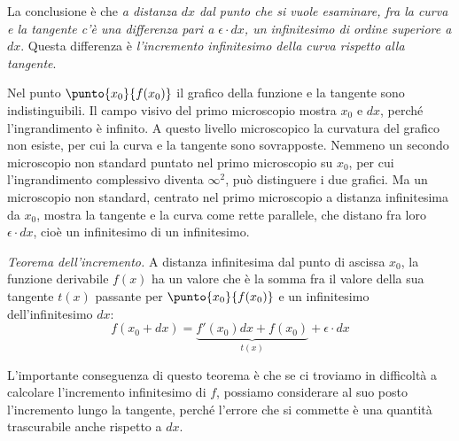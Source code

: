 La conclusione è che \emph{a distanza \(dx\) dal punto che si vuole 
esaminare, fra la curva e la tangente c'è una differenza pari a 
\(\epsilon\cdot dx\), un infinitesimo di ordine superiore a \(dx\)}. 
Questa differenza è \emph{l'incremento infinitesimo della curva rispetto 
alla tangente}.

\begin{minipage}[]{.47\textwidth}
\begin{inaccessibleblock}
    \begin{center} \differenzialens \end{center}
\end{inaccessibleblock}
\end{minipage} 
  \hfill
\begin{minipage}[]{.47\textwidth} \vspace{2.5em}
Nel punto \(\punto{x_0}{f(x_0)}\) il grafico della funzione e la tangente
sono indistinguibili. 
Il campo visivo del primo microscopio mostra \({x_0}\) e \(dx\), 
perché l'ingrandimento è infinito. A questo livello 
microscopico la curvatura del grafico non esiste,  per cui la curva e 
la tangente sono sovrapposte. 
Nemmeno un secondo microscopio non standard puntato 
nel primo microscopio su \(x_0\), per cui 
l'ingrandimento complessivo diventa \(\infty^2\), può distinguere i due 
grafici. 
Ma un microscopio non standard, centrato nel primo microscopio a 
distanza infinitesima da \(x_0\), mostra la tangente e 
la curva come rette parallele, che distano fra loro 
\(\epsilon \cdot dx\), cioè un infinitesimo di un infinitesimo.
\end{minipage}
\label{}

\begin{teorema}
\label{teo:inc}
\emph{Teorema dell'incremento.} A distanza infinitesima dal punto di 
ascissa \(x_0\), la funzione derivabile \(f(x)\) ha un valore che è la 
somma fra il valore della sua tangente \(t(x)\) passante per 
\(\punto{x_0}{f(x_0)}\) e un infinitesimo dell'infinitesimo \(dx\):
\[f(x_0+dx)=\underbrace{f'(x_0)dx+f(x_0)}_{t(x)}+\epsilon\cdot dx\]
\end{teorema}
L'importante conseguenza di questo teorema è che se ci troviamo in 
difficoltà a calcolare l'incremento infinitesimo di 
\(f\), possiamo considerare al suo posto l'incremento lungo la 
tangente, perché l'errore che si commette è una quantità trascurabile anche 
rispetto a \(dx\).



